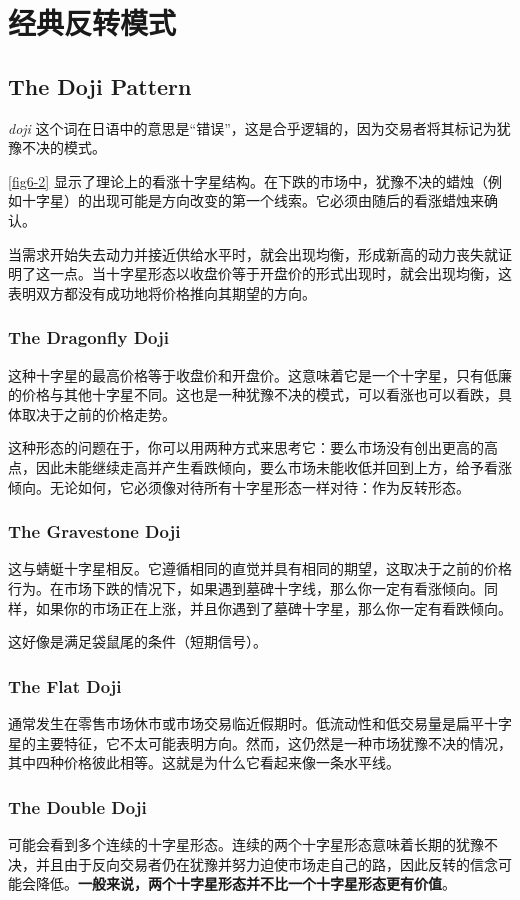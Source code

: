 \chapter{经典反转模式}
\section{The Doji Pattern}
\textit{doji} 这个词在日语中的意思是“错误”，这是合乎逻辑的，因为交易者将其标记为犹豫不决的模式。


\autoref{fig6-2} 显示了理论上的看涨十字星结构。在下跌的市场中，犹豫不决的蜡烛（例如十字星）的出现可能是方向改变的第一个线索。它必须由随后的看涨蜡烛来确认。

当需求开始失去动力并接近供给水平时，就会出现均衡，形成新高的动力丧失就证明了这一点。当十字星形态以收盘价等于开盘价的形式出现时，就会出现均衡，这表明双方都没有成功地将价格推向其期望的方向。
\subsection*{The Dragonfly Doji}
这种十字星的最高价格等于收盘价和开盘价。这意味着它是一个十字星，只有低廉的价格与其他十字星不同。这也是一种犹豫不决的模式，可以看涨也可以看跌，具体取决于之前的价格走势。

这种形态的问题在于，你可以用两种方式来思考它：要么市场没有创出更高的高点，因此未能继续走高并产生看跌倾向，要么市场未能收低并回到上方，给予看涨倾向。无论如何，它必须像对待所有十字星形态一样对待：作为反转形态。
\subsection*{The Gravestone Doji}
这与蜻蜓十字星相反。它遵循相同的直觉并具有相同的期望，这取决于之前的价格行为。在市场下跌的情况下，如果遇到墓碑十字线，那么你一定有看涨倾向。同样，如果你的市场正在上涨，并且你遇到了墓碑十字星，那么你一定有看跌倾向。

这好像是满足袋鼠尾的条件（短期信号）。
\subsection*{The Flat Doji}
通常发生在零售市场休市或市场交易临近假期时。低流动性和低交易量是扁平十字星的主要特征，它不太可能表明方向。然而，这仍然是一种市场犹豫不决的情况，其中四种价格彼此相等。这就是为什么它看起来像一条水平线。
\subsection*{The Double Doji}
可能会看到多个连续的十字星形态。连续的两个十字星形态意味着长期的犹豫不决，并且由于反向交易者仍在犹豫并努力迫使市场走自己的路，因此反转的信念可能会降低。\textbf{一般来说，两个十字星形态并不比一个十字星形态更有价值}。

